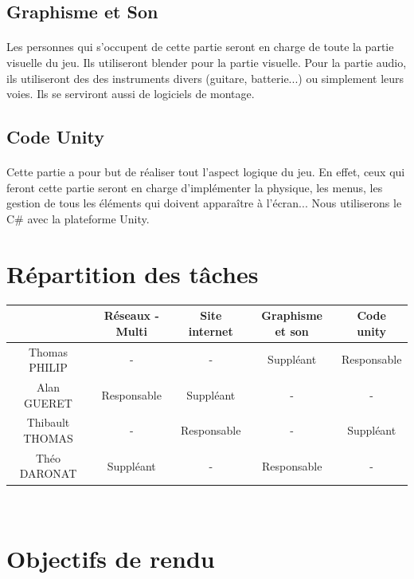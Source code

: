 \documentclass[12pt]{report}
\begin{document}
		\subsection{Graphisme et Son}
		\paragraph{}
		Les personnes qui s'occupent de cette partie seront en charge de toute la partie visuelle du jeu. Ils utiliseront blender pour la partie visuelle. Pour la partie audio, ils utiliseront des
des instruments divers (guitare, batterie...) ou simplement
leurs voies. Ils se serviront aussi de logiciels de montage.\\

		\subsection{Code Unity}
		\paragraph{}
			Cette partie a pour but de réaliser tout l'aspect logique du jeu. En effet, ceux qui feront cette partie seront en charge d'implémenter la physique, les menus, les gestion de tous les éléments qui doivent apparaître à l'écran... Nous
utiliserons le C\# avec la plateforme Unity.\\

	\section{Répartition des tâches}	
	
	\begin{tabular}{|*{5}{c|}}
	\hline
		& Réseaux - Multi & Site internet & Graphisme et son & Code unity \\
		\hline
		Thomas PHILIP & - & - & Suppléant & Responsable \\
		\hline
		Alan GUERET & Responsable & Suppléant & - & - \\
		\hline
		Thibault THOMAS & - & Responsable & - & Suppléant \\
		\hline
		Théo DARONAT & Suppléant & - & Responsable & - \\
		\hline
	
	\end{tabular}
	\\
	
	\section{Objectifs de rendu}
	
\end{document}
